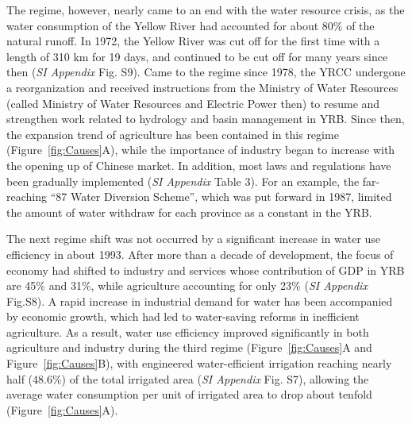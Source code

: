 \documentclass[9pt, twocolumn, twoside, lineno]{pnas-new}
\begin{document}
The regime, however, nearly came to an end with the water resource crisis, as the water consumption of the Yellow River had accounted for about 80\% of the natural runoff. In 1972, the Yellow River was cut off for the first time with a length of 310 km for 19 days, and continued to be cut off for many years since then (\textit{SI Appendix} Fig. S9). 
Came to the regime since 1978, the YRCC undergone a reorganization and received instructions from the Ministry of Water Resources (called Ministry of Water Resources and Electric Power then) to resume and strengthen work related to hydrology and basin management in YRB.
Since then, the expansion trend of agriculture has been contained in this regime (Figure~\ref{fig:Causes}A), while the importance of industry began to increase with the opening up of Chinese market. In addition, most laws and regulations have been gradually implemented (\textit{SI Appendix} Table 3). For an example, the far-reaching “87 Water Diversion Scheme”, which was put forward in 1987, limited the amount of water withdraw for each province as a constant in the YRB.

The next regime shift was not occurred by a significant increase in water use efficiency in about 1993. 
After more than a decade of development, the focus of economy had shifted to industry and services whose contribution of GDP in YRB are 45\% and 31\%, while agriculture accounting for only 23\% (\textit{SI Appendix} Fig.S8).
A rapid increase in industrial demand for water has been accompanied by economic growth, which had led to water-saving reforms in inefficient agriculture. As a result, water use efficiency improved significantly in both agriculture and industry during the third regime (Figure~\ref{fig:Causes}A and Figure~\ref{fig:Causes}B), with engineered water-efficient irrigation reaching nearly half (48.6\%) of the total irrigated area (\textit{SI Appendix} Fig. S7), allowing the average water consumption per unit of irrigated area to drop about tenfold (Figure~\ref{fig:Causes}A).
\end{document}
